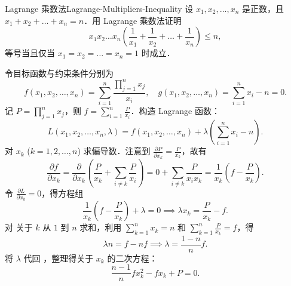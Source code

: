 \begin{problem}{Lagrange 乘数法}{Lagrange-Multipliers-Inequality}
    设 $x_1, x_2, \dots, x_n$ 是正数，且 $x_1 + x_2 + \dots + x_n = n$．用 Lagrange 乘数法证明
    \begin{equation}
        x_1 x_2 \dots x_n \left( \frac{1}{x_1} + \frac{1}{x_2} + \dots + \frac{1}{x_n} \right) \le n,
    \end{equation}
    等号当且仅当 $x_1 = x_2 = \dots = x_n = 1$ 时成立．
\end{problem}

\begin{myproof}

    令目标函数与约束条件分别为
    \begin{equation}
        f(x_1, x_2, \dots, x_n) = \sum_{i=1}^n \frac{\prod_{j=1}^n x_j}{x_i}, \quad g(x_1, x_2, \dots, x_n) = \sum_{i=1}^n x_i - n = 0.
    \end{equation}
    记 $P = \prod_{j=1}^n x_j$，则 $f = \sum_{i=1}^n \frac{P}{x_i}$．构造 Lagrange 函数：
    \begin{equation}
        L(x_1, x_2, \dots, x_n, \lambda) = f(x_1, x_2, \dots, x_n) + \lambda \left( \sum_{i=1}^n x_i - n \right).
    \end{equation}
    对 $x_k$ ($k = 1, 2, \dots, n$) 求偏导数．注意到 $\frac{\partial P}{\partial x_k} = \frac{P}{x_k}$，故有
    \begin{equation}\label{eq:partial-f}
        \frac{\partial f}{\partial x_k} = \frac{\partial}{\partial x_k} \left( \frac{P}{x_k} + \sum_{i \neq k} \frac{P}{x_i} \right) = 0 + \sum_{i \neq k} \frac{P}{x_i x_k} = \frac{1}{x_k} \left( f - \frac{P}{x_k} \right).
    \end{equation}
    令 $\frac{\partial L}{\partial x_k} = 0$，得方程组
    \begin{equation}\label{eq:stationary-cond}
        \frac{1}{x_k} \left( f - \frac{P}{x_k} \right) + \lambda = 0 \implies \lambda x_k = \frac{P}{x_k} - f.
    \end{equation}
    对  关于 $k$ 从 $1$ 到 $n$ 求和，利用 $\sum_{k=1}^n x_k = n$ 和 $\sum_{k=1}^n \frac{P}{x_k} = f$，得
    \begin{equation}
        \lambda n = f - nf \implies \lambda = \frac{1-n}{n} f.
    \end{equation}
    将 $\lambda$ 代回 ，整理得关于 $x_k$ 的二次方程：
    \begin{equation}\label{eq:quadratic-res}
        \frac{n-1}{n} f x_k^2 - f x_k + P = 0.

\end{equation}
\end{myproof}
